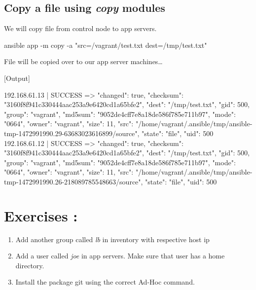 \subsection{Copy a file using \emph{copy} modules}

We will copy file from control node to app servers.

\begin{code}
ansible app -m copy -a "src=/vagrant/test.txt dest=/tmp/test.txt"
\end{code}

File will be copied over to our app server machines\ldots{}

[Output]\newline
\begin{code}
192.168.61.13 | SUCCESS => {
    "changed": true,
    "checksum": "3160f8f941c330444aac253a9e6420cd1a65bfe2",
    "dest": "/tmp/test.txt",
    "gid": 500,
    "group": "vagrant",
    "md5sum": "9052de4cff7e8a18de586f785e711b97",
    "mode": "0664",
    "owner": "vagrant",
    "size": 11,
    "src": "/home/vagrant/.ansible/tmp/ansible-tmp-1472991990.29-63683023616899/source",
    "state": "file",
    "uid": 500
}
192.168.61.12 | SUCCESS => {
    "changed": true,
    "checksum": "3160f8f941c330444aac253a9e6420cd1a65bfe2",
    "dest": "/tmp/test.txt",
    "gid": 500,
    "group": "vagrant",
    "md5sum": "9052de4cff7e8a18de586f785e711b97",
    "mode": "0664",
    "owner": "vagrant",
    "size": 11,
    "src": "/home/vagrant/.ansible/tmp/ansible-tmp-1472991990.26-218089785548663/source",
    "state": "file",
    "uid": 500
}
\end{code}

\section{Exercises :}

\begin{enumerate}
\item Add another group called \emph{lb} in inventory with respective host ip
\item Add a user called \emph{joe} in app servers. Make sure that user has a home directory.
\item Install the package git using the correct Ad-Hoc command.
\end{enumerate}